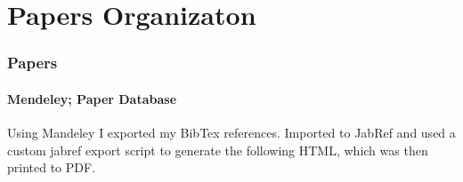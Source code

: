 \section{Papers Organizaton}

\begin{frame}
    \frametitle{Papers}
    \framesubtitle{Mendeley; Paper Database}

	Using Mandeley I exported my BibTex references. Imported to JabRef and used a custom jabref export script to generate the following HTML, which was then printed to PDF. 

\end{frame}

{

}
